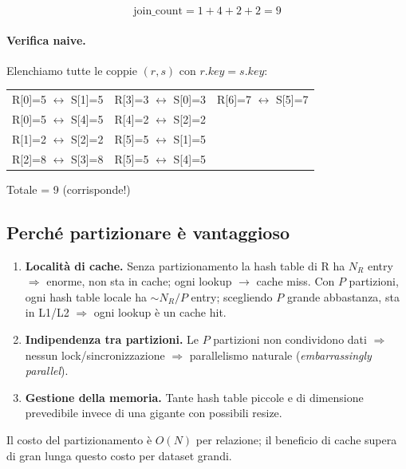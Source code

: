 \documentclass[11pt,a4paper]{article}
\begin{document}
\[
\text{join\_count} = 1 + 4 + 2 + 2 = \boxed{9}
\]

\paragraph{Verifica naive.} Elenchiamo tutte le coppie $(r,s)$ con $r.\mathit{key} = s.\mathit{key}$:

\begin{center}\small
\begin{tabular}{ccc}
R[0]=5 $\leftrightarrow$ S[1]=5 & R[3]=3 $\leftrightarrow$ S[0]=3 & R[6]=7 $\leftrightarrow$ S[5]=7 \\
R[0]=5 $\leftrightarrow$ S[4]=5 & R[4]=2 $\leftrightarrow$ S[2]=2 & \\
R[1]=2 $\leftrightarrow$ S[2]=2 & R[5]=5 $\leftrightarrow$ S[1]=5 & \\
R[2]=8 $\leftrightarrow$ S[3]=8 & R[5]=5 $\leftrightarrow$ S[4]=5 & \\
\end{tabular}
\end{center}
Totale = 9 \checkmark \; (corrisponde!)


\subsection{Perché partizionare è vantaggioso}

\begin{enumerate}[leftmargin=*]
\item \textbf{Località di cache.}
Senza partizionamento la hash table di R ha $N_R$ entry $\Rightarrow$ enorme, non sta in cache; ogni lookup $\to$ cache miss.
Con $P$ partizioni, ogni hash table locale ha $\sim N_R/P$ entry; scegliendo $P$ grande abbastanza, sta in L1/L2 $\Rightarrow$ ogni lookup è un cache hit.

\item \textbf{Indipendenza tra partizioni.}
Le $P$ partizioni non condividono dati $\Rightarrow$ nessun lock/sincronizzazione $\Rightarrow$ parallelismo naturale (\emph{embarrassingly parallel}).

\item \textbf{Gestione della memoria.}
Tante hash table piccole e di dimensione prevedibile invece di una gigante con possibili resize.
\end{enumerate}

Il costo del partizionamento è $O(N)$ per relazione; il beneficio di cache supera di gran lunga questo costo per dataset grandi.
\end{document}
